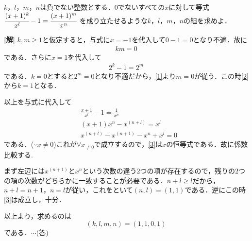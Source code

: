 \documentclass[a4j]{jarticle}
\begin{document}

     \begin{oframed}
     $k$，$l$，$m$，$n$は負でない整数とする．$0$でないすべての$x$に対して等式$\cfrac{(x+1)^k}{x^l}-1=\cfrac{(x+1)^m}{x^n}$
     を成り立たせるような$k$，$l$，$m$，$n$の組を求めよ．
     \end{oframed}

\setlength{\columnseprule}{0.4pt}
\begin{multicols}{2}
{\bf[解]} $k,m\ge1$と仮定すると，与式に$x=-1$を代入して$0-1=0$となり不適．故に
     \begin{align}
     km=0\label{1}
     \end{align}
である．さらに$x=1$を代入して
     \begin{align}
     2^k-1=2^m\label{2}
     \end{align}
である．$k=0$とすると$2^m=0$となり不適だから，\eqref{1}より$m=0$が従う．この時\eqref{2}から$k=1$となる．

以上を与式に代入して
     \begin{align}
     &\frac{x+1}{x^l}-1=\frac{1}{x^n} \nonumber \\
     &(x+1)x^n-x^{(n+l)}=x^l　\nonumber \\
     &x^{(n+l)}-x^{(n+1)}-x^n+x^l=0 \label{3}
     \end{align}
である．($\because x\not=0$)これが$\forall x_{\not=0}$で成立するので，\eqref{3}は$x$の恒等式である．故に係数比較する.

まず左辺には$x^{(n+1)}$と$x^n$という次数の違う$2$つの項が存在するので，残りの$2$つの項の次数がどちらかに一致することが必要である．$n+l\ge l$だから，$n+l=n+1$，$n=l$が従い，これをといて$(n,l)=(1,1)$である．逆にこの時\eqref{3}は成立し，十分．

以上より，求めるのは
     \[(k,l,m,n)=(1,1,0,1)\]
である．$\cdots$(答)
     
\newpage
\end{multicols}
\end{document}
